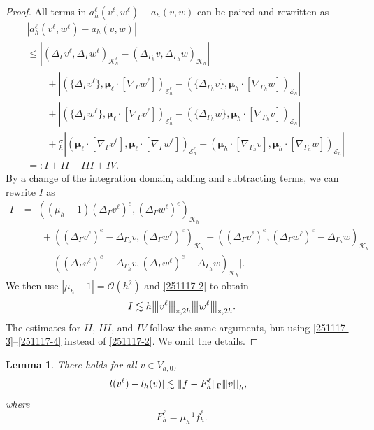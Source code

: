 \documentclass[10pt, a4paper]{amsart}
\newcommand{\nab}{\nabla}
\newcommand{\bmu}{{\bm \mu}}
\newcommand{\calE}{\mathcal{E}}
\newcommand{\calK}{\mathcal{K}}
\newcommand{\calO}{\mathcal{O}}
\newtheorem{lemma}[theorem]{Lemma}
\theoremstyle{definition}
\theoremstyle{remark}
\theoremstyle{example}
\numberwithin{equation}{section}
\newcommand{\tbar}[1]{{\left\vert\kern-0.25ex\left\vert\kern-0.25ex\left\vert #1 
    \right\vert\kern-0.25ex\right\vert\kern-0.25ex\right\vert}}
\begin{document}
\begin{proof}
All terms in $a_h^\ell(v^\ell, w^\ell) - a_h(v, w)$ can be paired and rewritten as
\begin{align*}
& |a_h^\ell(v^\ell, w^\ell) - a_h(v, w)| \\
& \le \left|(\Delta_{\Gamma}v^\ell, \Delta_{\Gamma}w^\ell)_{\calK^\ell_h} - (\Delta_{\Gamma_h}v, \Delta_{\Gamma_h}w)_{\calK_h}\right| \\
& \qquad + \left|(\{\Delta_{\Gamma}v^\ell\}, \bmu_{\ell} \cdot [\nab_{\Gamma}w^\ell])_{\calE_h^\ell} - (\{\Delta_{\Gamma_h}v\}, \bmu_h \cdot [\nab_{\Gamma_h}w])_{\calE_h}\right| \\
& \qquad + \left|(\{\Delta_{\Gamma}w^\ell\}, \bmu_{\ell} \cdot [\nab_{\Gamma}v^\ell])_{\calE_h^\ell} - (\{\Delta_{\Gamma_h}w\}, \bmu_h \cdot [\nab_{\Gamma_h}v])_{\calE_h}\right| \\
& \qquad + \frac{\sigma}{h}\left|(\bmu_{\ell} \cdot [\nab_{\Gamma}v^\ell], \bmu_{\ell} \cdot [\nab_{\Gamma}w^\ell])_{\calE_h^\ell} - (\bmu_h \cdot [\nab_{\Gamma_h}v], \bmu_h \cdot [\nab_{\Gamma_h}w])_{\calE_h}\right| \\
& =: I + II + III + IV.
\end{align*}
By a change of the integration domain, adding and subtracting terms, we can rewrite $I$  as
\begin{align*}
I
& = \Big|((\mu_h - 1)(\Delta_{\Gamma}v^\ell)^e, (\Delta_{\Gamma}w^\ell)^e)_{\calK_h} \\
& \qquad + ((\Delta_{\Gamma}v^\ell)^e - \Delta_{\Gamma_h}v, (\Delta_{\Gamma}w^\ell)^e)_{\calK_h} + ((\Delta_{\Gamma}v^\ell)^e, (\Delta_{\Gamma}w^\ell)^e - \Delta_{\Gamma_h}w)_{\calK_h} \\
& \qquad - ((\Delta_{\Gamma}v^\ell)^e - \Delta_{\Gamma_h}v, (\Delta_{\Gamma}w^\ell)^e - \Delta_{\Gamma_h}w)_{\calK_h}\Big|.
\end{align*}
We then use $|\mu_h - 1| = \calO(h^2)$ and \eqref{251117-2} to obtain
\[
I
\lesssim h\tbar{v^\ell}_{*, 2h}\tbar{w^\ell}_{*, 2h}.
\]
The estimates for $II$, $III$, and $IV$ follow 
the same arguments, but using \eqref{251117-3}--\eqref{251117-4} instead of \eqref{251117-2}.
We omit the details.
\end{proof}



\begin{lemma} \label{251116-3}
There holds for all $v \in V_{h, 0}$,
\begin{align}
|l(v^\ell) - l_h(v)|
& \lesssim \|f-F^\ell_h\|_{\Gamma}\tbar{v}_{ h} \label{4.6},
\end{align}
where
\begin{equation} \label{FhDef}
F^\ell_h = \mu_h^{-1}f^\ell_h.
\end{equation}
\end{lemma}
\end{document}
